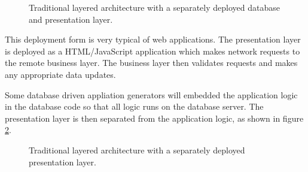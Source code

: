 \begin{figure}[ht]
    \centering
    \caption{Traditional layered architecture with a separately deployed database and presentation layer.}
    \label{fig:layered-db-pres-separated}
\end{figure}

This deployment form is very typical of web applications.
The presentation layer is deployed as a \mbox{HTML/}JavaScript application which makes network requests to the remote business layer.
The business layer then validates requests and makes any appropriate data updates.

Some database driven appliation generators will embedded the application logic in the database code
so that all logic runs on the database server.
The presentation layer is then separated from the application logic,
as shown in figure \ref{fig:layered-pres-separated}.

\begin{figure}[ht]
    \centering
    \caption{Traditional layered architecture with a separately deployed presentation layer.}
    \label{fig:layered-pres-separated}
\end{figure}

